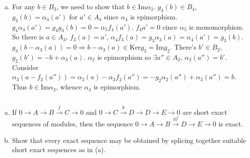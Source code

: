 \begin{answer}
\begin{enumerate}[(a)]
        \item For any $b\in B_{3}$, we need to show that $b\in \mathrm{Im}\alpha_{3}$. $g_{3}(b)\in B_{4}$, $g_{3}(b)=\alpha_{4}(a')$ for $a'\in A_{4}$ since $\alpha_{4}$ is epimorphism. $g_{4}\alpha_{4}(a')=g_{4}g_{3}(b)=0=\alpha_{5}f_{4}(a')$. $f_{4}a'=0$ cince $\alpha_{5}$ is monomorphism. So there is $a\in A_{3}$, $f_{3}(a)=a'$, $\alpha_{4}f_{3}(a)=g_{3}\alpha_{3}(a)=\alpha_{4}(a')=g_{3}(b)$. $g_{3}(b-\alpha_{3}(a))=0\Rightarrow b-\alpha_{3}(a)\in\mathrm{Ker}g_{3}=\mathrm{Im}g_{2}$. There's $b'\in B_{2}$, $g_{2}(b')=-b+\alpha_{3}(a)$. $\alpha_{2}$ is epimorphism so $\exists a''\in A_{2}$, $\alpha_{2}(a'')=b'$. Consider $\alpha_{3}(a-f_{2}(a''))=\alpha_{3}(a)-\alpha_{3}f_{2}(a'')=-g_{2}\alpha_{2}(a'')+\alpha_{3}(a'')=b$. Thus $b\in \mathrm{Im}\alpha_{3}$, whence $\alpha_{3}$ is epimorphism.
    \end{enumerate}
\end{answer}

$$ $$

\begin{ex}
    \begin{enumerate}[(a)]
        \item If $0\to A\to B\xrightarrow{f} C\to 0$ and $0\to C\xrightarrow{g} D\to D\to E\to 0$ are short exact sequences of modules, then the sequence $0\to A\to B\xrightarrow{gf}D \to E\to 0$ is exact.
        \item Show that every exact sequence may be obtained by splicing together suitable short exact sequences as in (a).
    \end{enumerate}
\end{ex}

